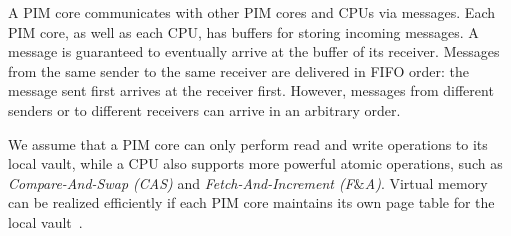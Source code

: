 A PIM core communicates with other PIM cores and CPUs via messages.
Each PIM core, as well as each CPU, has buffers for storing incoming messages.
A message is guaranteed to eventually arrive at the buffer of its receiver.
Messages from the same sender to the same receiver are delivered in FIFO order: 
the message sent first arrives at the receiver first. 
However, messages from different senders or to different receivers can arrive in an arbitrary order. 

We assume that a PIM core can only perform read and write operations 
to its local vault, while a CPU also supports more powerful atomic operations, such as \emph{Compare-And-Swap (CAS)} 
and \emph{Fetch-And-Increment (F$\&$A)}.
Virtual memory can be realized efficiently if  
each PIM core maintains its own page table for the local vault~\cite{hsieh2016accelerating}.